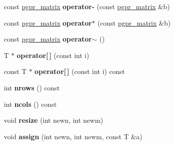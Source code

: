 \begin{DoxyCompactItemize}
\item 
\hypertarget{classpgpr__matrix_a4189e190c71b3cec286b3477e8088306}{const \hyperlink{classpgpr__matrix}{pgpr\+\_\+matrix} {\bfseries operator-\/} (const \hyperlink{classpgpr__matrix}{pgpr\+\_\+matrix} \&b)}\label{classpgpr__matrix_a4189e190c71b3cec286b3477e8088306}

\item 
\hypertarget{classpgpr__matrix_ac69cbaac0bfe2e5899333bf13af71a17}{const \hyperlink{classpgpr__matrix}{pgpr\+\_\+matrix} {\bfseries operator$\ast$} (const \hyperlink{classpgpr__matrix}{pgpr\+\_\+matrix} \&b)}\label{classpgpr__matrix_ac69cbaac0bfe2e5899333bf13af71a17}

\item 
\hypertarget{classpgpr__matrix_a3a5d2782837b835f75208182298913a2}{const \hyperlink{classpgpr__matrix}{pgpr\+\_\+matrix} {\bfseries operator$\sim$} ()}\label{classpgpr__matrix_a3a5d2782837b835f75208182298913a2}

\item 
\hypertarget{classpgpr__matrix_aa927ef3ca93939182c9d29c81623fb44}{T $\ast$ {\bfseries operator\mbox{[}$\,$\mbox{]}} (const int i)}\label{classpgpr__matrix_aa927ef3ca93939182c9d29c81623fb44}

\item 
\hypertarget{classpgpr__matrix_a2c4b2fc108046af40cbc8ec2716a3f53}{const T $\ast$ {\bfseries operator\mbox{[}$\,$\mbox{]}} (const int i) const }\label{classpgpr__matrix_a2c4b2fc108046af40cbc8ec2716a3f53}

\item 
\hypertarget{classpgpr__matrix_a7eb8e4706b5572e74efec76578129a71}{int {\bfseries nrows} () const }\label{classpgpr__matrix_a7eb8e4706b5572e74efec76578129a71}

\item 
\hypertarget{classpgpr__matrix_a54e645e13bd7f8f2a713f428c840a061}{int {\bfseries ncols} () const }\label{classpgpr__matrix_a54e645e13bd7f8f2a713f428c840a061}

\item 
\hypertarget{classpgpr__matrix_ac2746dd90e4586c31d8a13d1c66a057e}{void {\bfseries resize} (int newn, int newm)}\label{classpgpr__matrix_ac2746dd90e4586c31d8a13d1c66a057e}

\item 
\hypertarget{classpgpr__matrix_a54fa5240d2f0c1a8c034f7e15a8e756c}{void {\bfseries assign} (int newn, int newm, const T \&a)}\label{classpgpr__matrix_a54fa5240d2f0c1a8c034f7e15a8e756c}

\end{DoxyCompactItemize}


